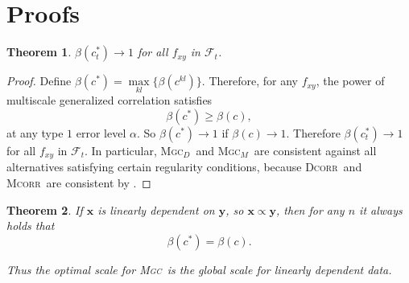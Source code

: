 \documentclass[11pt]{article}
\providecommand{\sct}[1]{{\normalfont\textsc{#1}}}
\providecommand{\mb}[1]{\boldsymbol{#1}}
\providecommand{\mc}[1]{\mathcal{#1}}
\newcommand{\G}{c}
\newcommand{\Mgc}{\sct{Mgc}}
\newcommand{\Mgcd}{\sct{Mgc$_D$}}
\newcommand{\Mgcm}{\sct{Mgc$_M$}}
\newcommand{\Dcorr}{\sct{Dcorr}}
\newcommand{\Mcorr}{\sct{Mcorr}}
\newtheorem{appThm}{Theorem}
\begin{document}

\section{Proofs}
\label{appen:proofs}
\begin{appThm}
$\beta(\G_t^*) \rightarrow 1$ for all $f_{xy}$ in $\mc{F}_t$.
\end{appThm}
\begin{proof}
Define $\beta(\G^{*})=\underset{kl}{\max}\{\beta(\G^{kl})\}$. Therefore, for any $f_{xy}$, the power of multiscale generalized correlation satisfies
\begin{equation*}
\beta(\G^*) \geq \beta(\G),
\end{equation*}
at any type $1$ error level $\alpha$. So $\beta(\G^{*}) \rightarrow 1$ if $\beta(\G) \rightarrow 1$.
% 
Therefore $\beta(\G_t^*) \rightarrow 1$ for all $f_{xy}$ in $\mc{F}_t$. In particular, \Mgcd~and \Mgcm~are consistent against all alternatives satisfying certain regularity conditions, because \Dcorr~and \Mcorr~are consistent by \cite{SzekelyRizzoBakirov2007, SzekelyRizzo2013a}. 
\end{proof}

\begin{appThm}
\label{at:linear}
If $\mb{x}$ is linearly dependent on $\mb{y}$, so $\mb{x} \propto \mb{y}$, then for any $n$ it always holds that
\begin{equation*}
\beta(\G^{*}) = \beta(\G).
\end{equation*}

Thus the optimal scale for \Mgc~is the global scale for linearly dependent data.
\end{appThm}
\end{document}

